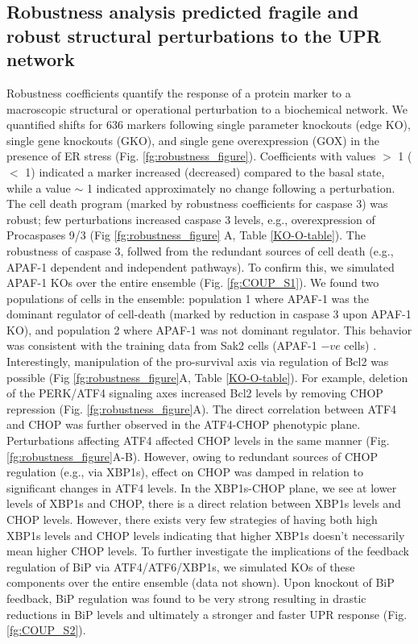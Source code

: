 \documentclass[fleqn,10pt]{wlscirep}
\begin{document}
\subsection*{Robustness analysis predicted fragile and robust structural perturbations to the UPR network}
Robustness coefficients quantify the response of a protein marker to a macroscopic structural or operational perturbation to a biochemical network.
We quantified shifts for 636 markers following single parameter knockouts (edge KO), single gene knockouts (GKO), and single gene overexpression (GOX) in the presence of ER stress (Fig. \ref{fg:robustness_figure}).
Coefficients with values $>$ 1 ($<$ 1) indicated a marker increased (decreased) compared to the basal state, while a value $\sim$ 1 indicated approximately no change following a perturbation.
The cell death program (marked by robustness coefficients for caspase 3) was robust; few perturbations increased caspase 3 levels, e.g., overexpression of Procaspases 9/3 (Fig \ref{fg:robustness_figure} A, Table \ref{KO-O-table}).
The robustness of caspase 3, follwed from the redundant sources of cell death (e.g., APAF-1 dependent and independent pathways).
To confirm this, we simulated APAF-1 KOs over the entire ensemble (Fig. \ref{fg:COUP_S1}).
We found two populations of cells in the ensemble: population 1 where APAF-1 was the dominant regulator of cell-death (marked by reduction in caspase 3 upon APAF-1 KO),
and population 2 where APAF-1 was not dominant regulator.
This behavior was consistent with the training data from Sak2 cells (APAF-1 $-ve$ cells) \cite{rao2002cer}.
Interestingly, manipulation of the pro-survival axis via regulation of Bcl2 was possible (Fig \ref{fg:robustness_figure}A, Table \ref{KO-O-table}).
For example, deletion of the PERK/ATF4 signaling axes increased Bcl2 levels by removing CHOP repression (Fig. \ref{fg:robustness_figure}A).
The direct correlation between ATF4 and CHOP was further observed in the ATF4-CHOP phenotypic plane.
Perturbations affecting ATF4 affected CHOP levels in the same manner (Fig. \ref{fg:robustness_figure}A-B).
However, owing to redundant sources of CHOP regulation (e.g., via XBP1s), effect on CHOP was damped in relation to significant changes in ATF4 levels.
In the XBP1s-CHOP plane, we see at lower levels of XBP1s and CHOP, there is a direct relation between XBP1s levels and CHOP levels.
However, there exists very few strategies of having both high XBP1s levels and CHOP levels indicating that higher XBP1s doesn't necessarily mean higher CHOP levels.
To further investigate the implications of the feedback regulation of BiP via ATF4/ATF6/XBP1s, we simulated KOs of these components over the entire ensemble (data not shown).
Upon knockout of BiP feedback, BiP regulation was found to be very strong resulting in drastic reductions in BiP levels and ultimately a stronger and faster UPR response (Fig. \ref{fg:COUP_S2}).
\end{document}
